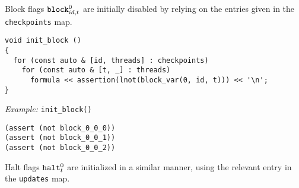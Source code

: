 \noindent
Block flags $\texttt{block}^0_{id, t}$ are initially disabled by relying on the entries given in the \texttt{checkpoints} map.

\newpage

\begin{lstlisting}[style=c++]
void init_block ()
{
  for (const auto & [id, threads] : checkpoints)
    for (const auto & [t, _] : threads)
      formula << assertion(lnot(block_var(0, id, t))) << '\n';
}
\end{lstlisting}

\noindent
\emph{Example:} \lstinline[style=c++]{init_block()}

\begin{lstlisting}[language=SMTLib]
(assert (not block_0_0_0))
(assert (not block_0_0_1))
(assert (not block_0_0_2))
\end{lstlisting}


\noindent
Halt flags $\texttt{halt}^0_t$ are initialized in a similar manner, using the relevant entry in the \texttt{updates} map.

